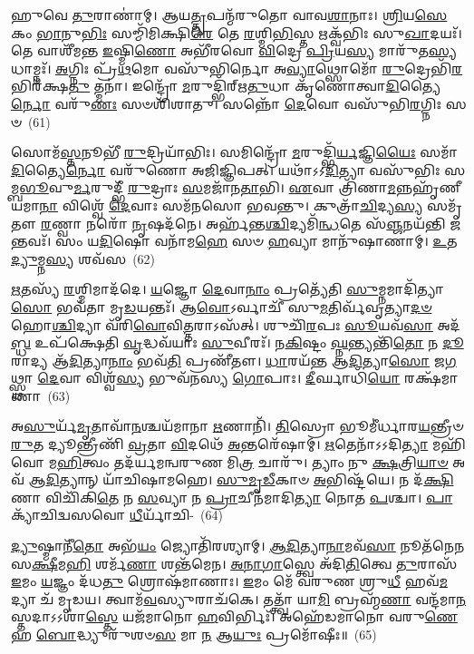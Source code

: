 𑌹𑍁𑌵𑍇 \ul{𑌤𑍁}\-𑌰𑌾𑌣𑌾॑𑌮𑍍। 𑌆𑌯\-\ul{𑌤𑍍𑌤𑍃}\-𑌪𑌨𑍍𑌮᳴𑌰𑍁𑌤𑍋 𑌵𑌾𑌵\-\ul{𑌶𑌾}\-𑌨𑌾𑌃। \ul{𑌶𑍍𑌰𑌿}\-𑌯\-\ul{𑌸𑍇} 𑌕𑌂 \ul{𑌭𑌾}\-𑌨𑍁\-\ul{𑌭𑌿𑌃} 𑌸𑌮𑍍𑌮𑌿᳴𑌮𑌿𑌕𑍍𑌷𑌿\-\ul{𑌰𑍇} 𑌤𑍇 \ul{𑌰}\-𑌶𑍍𑌮𑌿\-\ul{𑌭𑌿}\-𑌸𑍍𑌤 𑌋𑌕𑍍𑌵᳴𑌭𑌿𑌃 𑌸𑍁\-\ul{𑌖𑌾}\-𑌦𑌯𑌃᳴। 𑌤𑍇 𑌵𑌾𑌶𑍀᳴𑌮𑌨𑍍𑌤 \ul{𑌇}\-𑌷𑍍𑌮𑌿\-\ul{𑌣𑍋} 𑌅𑌭𑍀᳴𑌰𑌵𑍋 \ul{𑌵𑌿}\-𑌦𑍍𑌰𑍇 \ul{𑌪𑍍𑌰𑌿}\-𑌯\-\ul{𑌸𑍍𑌯} 𑌮𑌾𑌰𑍁᳴𑌤\-\ul{𑌸𑍍𑌯} 𑌧𑌾𑌮𑍍𑌨𑌃᳴। \ul{𑌅}\-𑌗𑍍𑌨𑌿𑌃 𑌪𑍍𑌰᳴\-\ul{𑌥}\-𑌮𑍋 𑌵𑌸𑍁᳴𑌭𑌿𑌰𑍍𑌨𑍋 𑌅\-\ul{𑌵𑍍𑌯𑌾}\-𑌥𑍍𑌸𑍋𑌮𑍋᳴ \ul{𑌰𑍁}\-𑌦𑍍𑌰𑍇𑌭𑌿᳴\-\ul{𑌰}\-𑌭𑌿𑌰᳴𑌕𑍍𑌷\-\ul{𑌤𑍁} 𑌤𑍍𑌮𑌨𑌾॑। 𑌇𑌨𑍍𑌦𑍍𑌰𑍋᳴ \ul{𑌮}\-𑌰𑍁𑌦𑍍𑌭𑌿᳴𑌰𑍍\mbox{}𑌋\-\ul{𑌤𑍁}\-𑌧𑌾 𑌕𑍃᳴𑌣𑍋𑌤𑍍𑌵𑌾\-\ul{𑌦𑌿}\-𑌤𑍍𑌯𑍈\-\ul{𑌰𑍍𑌨𑍋} 𑌵𑌰𑍁᳴\-\ul{𑌣𑌃} 𑌸𑍞𑌶𑌿᳴𑌶𑌾𑌤𑍁। 𑌸𑌨𑍍𑌨𑍋᳴ \ul{𑌦𑍇}\-𑌵𑍋 𑌵𑌸𑍁᳴𑌭𑌿\-\ul{𑌰}\-𑌗𑍍𑌨𑌿𑌃 𑌸𑍞~(61)

𑌸𑍋𑌮᳴\-\ul{𑌸𑍍𑌤}\-𑌨𑍂𑌭𑍀᳴ \ul{𑌰𑍁}\-𑌦𑍍𑌰𑌿𑌯𑌾᳴𑌭𑌿𑌃। 𑌸𑌮𑌿𑌨𑍍𑌦𑍍𑌰𑍋᳴ \ul{𑌮}\-𑌰𑍁𑌦𑍍𑌭𑌿᳴\-\ul{𑌰𑍍𑌯}\-𑌜𑍍𑌞𑌿\-\ul{𑌯𑍈𑌃} 𑌸𑌮𑌾᳴\-\ul{𑌦𑌿}\-𑌤𑍍𑌯𑍈\-\ul{𑌰𑍍𑌨𑍋} 𑌵𑌰𑍁᳴𑌣𑍋 𑌅𑌜𑌿𑌜𑍍𑌞𑌿𑌪𑌤𑍍। 𑌯𑌥𑌾᳴\-𑌽\-𑌽\-\ul{𑌦𑌿}\-𑌤𑍍𑌯𑌾 𑌵𑌸𑍁᳴𑌭𑌿𑌃 𑌸𑌮𑍍𑌬\-\ul{𑌭𑍂}\-𑌵𑍁\-\ul{𑌰𑍍𑌮}\-𑌰𑍁𑌦𑍍𑌭𑍀᳴ \ul{𑌰𑍁}\-𑌦𑍍𑌰𑌾𑌃 \ul{𑌸}\-𑌮𑌜𑌾᳴𑌨\-\ul{𑌤𑌾}\-𑌭𑌿। \ul{𑌏}\-𑌵𑌾 𑌤𑍍𑌰𑌿᳴𑌣𑌾\-\ul{𑌮}\-𑌨𑍍𑌨𑌹𑍃᳴𑌣𑍀𑌯𑌮𑌾\-\ul{𑌨𑌾} 𑌵𑌿𑌶𑍍𑌵𑍇᳴ \ul{𑌦𑍇}\-𑌵𑌾𑌃 𑌸𑌮᳴𑌨𑌸𑍋 𑌭𑌵𑌨𑍍𑌤𑍁। 𑌕𑍁𑌤𑍍𑌰𑌾᳴\-\ul{𑌚𑌿}\-𑌦𑍍𑌯\-\ul{𑌸𑍍𑌯} 𑌸𑌮𑍃᳴𑌤𑍗 \ul{𑌰}\-𑌣𑍍𑌵𑌾 𑌨𑌰𑍋᳴ \ul{𑌨𑍃}\-𑌷𑌦᳴𑌨𑍇। 𑌅𑌰𑍍\mbox{}𑌹᳴𑌨𑍍𑌤\-\ul{𑌶𑍍𑌚𑌿}\-𑌦𑍍𑌯𑌮𑌿᳴\-\ul{𑌨𑍍𑌧}\-𑌤𑍇 𑌸᳴\-\ul{𑌞𑍍𑌜}\-𑌨𑌯᳴𑌨𑍍𑌤𑌿 \ul{𑌜}\-𑌨𑍍𑌤𑌵𑌃᳴। 𑌸𑌂 𑌯\-\ul{𑌦𑌿}\-𑌷𑍋 𑌵𑌨𑌾᳴𑌮\-\ul{𑌹𑍇} 𑌸𑍞 \ul{𑌹}\-𑌵𑍍𑌯𑌾 𑌮𑌾𑌨𑍁᳴𑌷𑌾𑌣𑌾𑌮𑍍। \ul{𑌉}\-𑌤 \ul{𑌦𑍍𑌯𑍁}\-𑌮𑍍𑌨\-\ul{𑌸𑍍𑌯} 𑌶𑌵᳴𑌸~(62)

\-\ul{𑌋}\-𑌤𑌸𑍍𑌯᳴ \ul{𑌰}\-𑌶𑍍𑌮𑌿𑌮𑌾𑌦᳴𑌦𑍇। \ul{𑌯}\-𑌜𑍍𑌞𑍋 \ul{𑌦𑍇}\-𑌵𑌾\-\ul{𑌨𑌾𑌂} 𑌪𑍍𑌰𑌤𑍍𑌯𑍇᳴𑌤𑌿 \ul{𑌸𑍁}\-𑌮𑍍𑌨𑌮𑌾𑌦𑌿᳴𑌤𑍍𑌯𑌾\-\ul{𑌸𑍋} 𑌭𑌵᳴𑌤𑌾 𑌮𑍃\-\ul{𑌡}\-𑌯𑌨𑍍𑌤𑌃᳴। 𑌆\-\ul{𑌵𑍋}\-\-𑌽𑌰𑍍𑌵𑌾𑌚𑍀᳴ 𑌸𑍁\-\ul{𑌮}\-𑌤𑌿𑌰𑍍𑌵᳴𑌵𑍃𑌤𑍍𑌯𑌾\-\-\ul{𑌦}\-\-\ul{𑍞}\-𑌹𑍋\-\ul{𑌶𑍍𑌚𑌿}\-𑌦𑍍𑌯𑌾 𑌵᳴𑌰𑌿\-\ul{𑌵𑍋}\-𑌵𑌿\-\ul{𑌤𑍍𑌤}\-𑌰𑌾\-𑌽𑌸᳴𑌤𑍍। 𑌶𑍁𑌚𑌿᳴\-\ul{𑌰}\-𑌪𑌃 \ul{𑌸𑍂}\-𑌯𑌵᳴\-\ul{𑌸𑌾} 𑌅𑌦᳴\-\ul{𑌬𑍍𑌧} 𑌉𑌪᳴𑌕𑍍𑌷𑍇𑌤𑌿 \ul{𑌵𑍃}\-𑌦𑍍𑌧𑌵᳴𑌯𑌾𑌃 \ul{𑌸𑍁}\-𑌵𑍀𑌰𑌃᳴। 𑌨\-\ul{𑌕𑌿}\-𑌷𑍍𑌟𑌂 \ul{𑌘𑍍𑌨}\-𑌨𑍍𑌤𑍍𑌯𑌨𑍍𑌤𑌿᳴\-\ul{𑌤𑍋} 𑌨 \ul{𑌦𑍂}\-𑌰𑌾𑌦𑍍𑌯 𑌆᳴\-\ul{𑌦𑌿}\-𑌤𑍍𑌯𑌾\-\ul{𑌨𑌾𑌂} 𑌭𑌵᳴\-\ul{𑌤𑌿} 𑌪𑍍𑌰𑌣𑍀᳴𑌤𑍗। \ul{𑌧𑌾}\-𑌰𑌯᳴𑌨𑍍𑌤 𑌆\-\ul{𑌦𑌿}\-𑌤𑍍𑌯𑌾\-\ul{𑌸𑍋} 𑌜\-\ul{𑌗}\-𑌥𑍍𑌸𑍍𑌥𑌾 \ul{𑌦𑍇}\-𑌵𑌾 𑌵𑌿𑌶𑍍𑌵᳴\-\ul{𑌸𑍍𑌯} 𑌭𑍁𑌵᳴𑌨𑌸𑍍𑌯 \ul{𑌗𑍋}\-𑌪𑌾𑌃। \ul{𑌦𑍀}\-𑌰𑍍𑌘𑌾𑌧𑌿᳴\-\ul{𑌯𑍋} 𑌰𑌕𑍍𑌷᳴𑌮𑌾𑌣𑌾~(63)

𑌅\-\ul{𑌸𑍁}\-𑌰𑍍𑌯᳴\-\ul{𑌮𑍃}\-𑌤𑌾𑌵𑌾᳴\-\ul{𑌨}\-𑌶𑍍𑌚𑌯᳴𑌮𑌾𑌨𑌾 \ul{𑌋}\-𑌣𑌾𑌨𑌿᳴। \ul{𑌤𑌿}\-𑌸𑍍𑌰𑍋 𑌭𑍂𑌮𑍀॑𑌰𑍍𑌧𑌾𑌰\-\ul{𑌯}\-𑌨𑍍𑌤𑍍𑌰𑍀𑍞 \ul{𑌰𑍁}\-𑌤 𑌦𑍍𑌯𑍂𑌨𑍍𑌤𑍍𑌰𑍀𑌣𑌿᳴ \ul{𑌵𑍍𑌰}\-𑌤𑌾 \ul{𑌵𑌿}\-𑌦𑌥𑍇᳴ \ul{𑌅}\-𑌨𑍍𑌤𑌰𑍇᳴𑌷𑌾𑌮𑍍। \ul{𑌋}\-𑌤𑍇𑌨𑌾᳴𑌽𑌽𑌦𑌿\-\ul{𑌤𑍍𑌯𑌾} 𑌮𑌹𑌿᳴ 𑌵𑍋 𑌮\-\ul{𑌹𑌿}\-𑌤𑍍𑌵𑌂 𑌤𑌦᳴𑌰𑍍𑌯𑌮𑌨𑍍𑌵𑌰𑍁𑌣 𑌮𑌿\-\ul{𑌤𑍍𑌰} 𑌚𑌾𑌰𑍁᳴। 𑌤𑍍𑌯𑌾𑌂 𑌨𑍁 \ul{𑌕𑍍𑌷}\-𑌤𑍍𑌰𑌿\-\ul{𑌯𑌾}\-\-\ul{𑍞} 𑌅𑌵᳴ 𑌆\-\ul{𑌦𑌿}\-𑌤𑍍𑌯𑌾𑌨𑍍 𑌯𑌾᳴𑌚𑌿𑌷𑌾𑌮𑌹𑍇। \ul{𑌸𑍁}\-\-\ul{𑌮𑍃}\-\-\ul{𑌡𑍀}\-𑌕𑌾𑍞 \ul{𑌅}\-𑌭𑌿𑌷𑍍𑌟᳴𑌯𑍇। 𑌨 𑌦᳴\-\ul{𑌕𑍍𑌷𑌿}\-𑌣𑌾 𑌵𑌿𑌚𑌿᳴𑌕𑌿\-\ul{𑌤𑍇} 𑌨 \ul{𑌸}\-𑌵𑍍𑌯𑌾 𑌨 \ul{𑌪𑍍𑌰𑌾}\-𑌚𑍀𑌨᳴𑌮𑌾𑌦𑌿\-\ul{𑌤𑍍𑌯𑌾} 𑌨𑍋𑌤 \ul{𑌪}\-𑌶𑍍𑌚𑌾। \ul{𑌪𑌾}\-𑌕𑍍𑌯𑌾᳴𑌚𑌿𑌦𑍍𑌵𑌸𑌵𑍋 \ul{𑌧𑍀}\-𑌰𑍍𑌯𑌾᳴𑌚𑌿-~(64)

\-\ul{𑌦𑍍𑌯𑍁}\-𑌷𑍍𑌮𑌾𑌨𑍀᳴\-\ul{𑌤𑍋} 𑌅𑌭᳴\-\ul{𑌯𑌂} 𑌜𑍍𑌯𑍋𑌤𑌿᳴𑌰𑌶𑍍𑌯𑌾𑌮𑍍। \ul{𑌆}\-\-\ul{𑌦𑌿}\-𑌤𑍍𑌯𑌾\-\ul{𑌨𑌾}\-𑌮𑌵᳴\-\ul{𑌸𑌾} 𑌨𑍂𑌤᳴𑌨𑍇𑌨 𑌸\-\ul{𑌕𑍍𑌷𑍀}\-𑌮\-\ul{𑌹𑌿} 𑌶𑌰𑍍𑌮᳴\-\ul{𑌣𑌾} 𑌶𑌨𑍍𑌤᳴𑌮𑍇𑌨। \ul{𑌅}\-\-\ul{𑌨𑌾}\-\-\ul{𑌗𑌾}\-𑌸𑍍𑌤𑍍𑌵𑍇 𑌅᳴𑌦𑌿\-\ul{𑌤𑌿}\-𑌤𑍍𑌵𑍇 \ul{𑌤𑍁}\-𑌰𑌾𑌸᳴ \ul{𑌇}\-𑌮𑌂 \ul{𑌯}\-𑌜𑍍𑌞𑌂 𑌦᳴𑌧\-\ul{𑌤𑍁} 𑌶𑍍𑌰𑍋𑌷᳴𑌮𑌾𑌣𑌾𑌃। \ul{𑌇}\-𑌮𑌂 𑌮𑍇᳴ 𑌵𑌰𑍁𑌣 𑌶𑍍𑌰𑍁\-\ul{𑌧𑍀} 𑌹𑌵᳴\-\ul{𑌮}\-𑌦𑍍𑌯𑌾 𑌚᳴ 𑌮𑍃𑌡𑌯। 𑌤𑍍𑌵𑌾𑌮᳴\-\ul{𑌵}\-𑌸𑍍𑌯𑍁𑌰𑌾𑌚᳴𑌕𑍇। 𑌤𑌤𑍍𑌤𑍍𑌵𑌾᳴ 𑌯𑌾\-\ul{𑌮𑌿} 𑌬𑍍𑌰𑌹𑍍𑌮᳴\-\ul{𑌣𑌾} 𑌵𑌨𑍍𑌦᳴𑌮𑌾\-\ul{𑌨}\-𑌸𑍍𑌤𑌦𑌾𑌽𑌽𑌶𑌾॑\-\ul{𑌸𑍍𑌤𑍇} 𑌯𑌜᳴𑌮𑌾𑌨𑍋 \ul{𑌹}\-𑌵𑌿𑌰𑍍𑌭𑌿𑌃᳴। 𑌅𑌹𑍇᳴𑌡𑌮𑌾𑌨𑍋 𑌵𑌰𑍁\-\ul{𑌣𑍇}\-𑌹 \ul{𑌬𑍋}\-𑌦𑍍𑌧𑍍𑌯𑍁𑌰𑍁᳴𑌶𑍞\-\ul{𑌸} 𑌮𑌾 \ul{𑌨} 𑌆\-\ul{𑌯𑍁𑌃} 𑌪𑍍𑌰𑌮𑍋᳴𑌷𑍀𑌃॥~(65)

